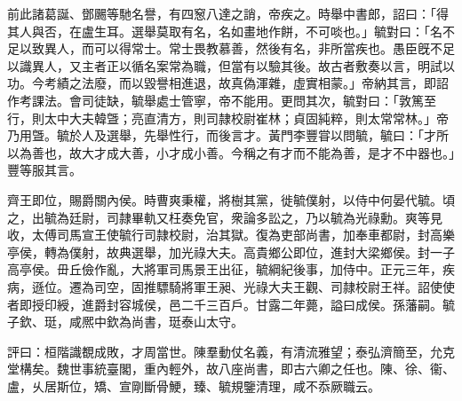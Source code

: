 \begin{pinyinscope}
 
 前此諸葛誕、鄧颺等馳名譽，有四䆫八達之誚，帝疾之。時舉中書郎，詔曰：「得其人與否，在盧生耳。選舉莫取有名，名如畫地作餅，不可啖也。」毓對曰：「名不足以致異人，而可以得常士。常士畏教慕善，然後有名，非所當疾也。愚臣旣不足以識異人，又主者正以循名案常為職，但當有以驗其後。故古者敷奏以言，明試以功。今考績之法廢，而以毀譽相進退，故真偽渾雜，虛實相蒙。」帝納其言，即詔作考課法。會司徒缺，毓舉處士管寧，帝不能用。更問其次，毓對曰：「敦篤至行，則太中大夫韓曁；亮直清方，則司隷校尉崔林；貞固純粹，則太常常林。」帝乃用曁。毓於人及選舉，先舉性行，而後言才。黃門李豐甞以問毓，毓曰：「才所以為善也，故大才成大善，小才成小善。今稱之有才而不能為善，是才不中器也。」豐等服其言。
 
 
齊王即位，賜爵關內侯。時曹爽秉權，將樹其黨，徙毓僕射，以侍中何晏代毓。頃之，出毓為廷尉，司隷畢軌又枉奏免官，衆論多訟之，乃以毓為光祿勳。爽等見收，太傅司馬宣王使毓行司隷校尉，治其獄。復為吏部尚書，加奉車都尉，封高樂亭侯，轉為僕射，故典選舉，加光祿大夫。高貴鄉公即位，進封大梁鄉侯。封一子高亭侯。毌丘儉作亂，大將軍司馬景王出征，毓綱紀後事，加侍中。正元三年，疾病，遜位。遷為司空，固推驃騎將軍王昶、光祿大夫王觀、司隷校尉王祥。詔使使者即授印綬，進爵封容城侯，邑二千三百戶。甘露二年薨，謚曰成侯。孫藩嗣。毓子欽、珽，咸熈中欽為尚書，珽泰山太守。
 
 
 
 
 評曰：桓階識覩成敗，才周當世。陳羣動仗名義，有清流雅望；泰弘濟簡至，允克堂構矣。魏世事統臺閣，重內輕外，故八座尚書，即古六卿之任也。陳、徐、衞、盧，乆居斯位，矯、宣剛斷骨鯁，臻、毓規鑒清理，咸不忝厥職云。
 
 
\end{pinyinscope}
